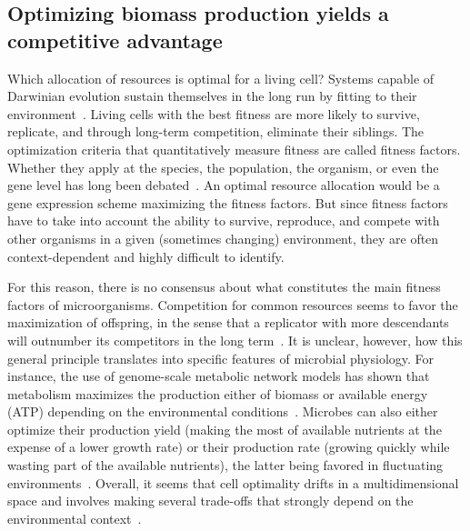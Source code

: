 \subsection{Optimizing biomass production yields a competitive advantage}

Which allocation of resources is optimal for a living cell?
Systems capable of Darwinian evolution sustain themselves in the long run by fitting to their environment~\cite{dawkins_selfish_1976}.
Living cells with the best fitness are more likely to survive, replicate, and through long-term competition, eliminate their siblings.
The optimization criteria that quantitatively measure fitness are called fitness factors.
Whether they apply at the species, the population, the organism, or even the gene level has long been debated~\cite{dawkins_selfish_1976}.
An optimal resource allocation would be a gene expression scheme maximizing the fitness factors.
But since fitness factors have to take into account the ability to survive, reproduce, and compete with other organisms in a given (sometimes changing) environment, they are often context-dependent and highly difficult to identify.

For this reason, there is no consensus about what constitutes the main fitness factors of microorganisms.
Competition for common resources seems to favor the maximization of offspring, in the sense that a replicator with more descendants will outnumber its competitors in the long term~\cite{dawkins_selfish_1976}.
It is unclear, however, how this general principle translates into specific features of microbial physiology.
For instance, the use of genome-scale metabolic network models has shown that metabolism maximizes the production either of biomass or available energy (ATP) depending on the environmental conditions~\cite{schuetz_systematic_2007}.
Microbes can also either optimize their production yield (making the most of available nutrients at the expense of a lower growth rate) or their production rate (growing quickly while wasting part of the available nutrients), the latter being favored in fluctuating environments~\cite{frank_tradeoff_2010,maclean_tragedy_2008,schuster_maximization_2008}.
Overall, it seems that cell optimality drifts in a multidimensional space and involves making several trade-offs that strongly depend on the environmental context~\cite{schuetz_multidimensional_2012}.

